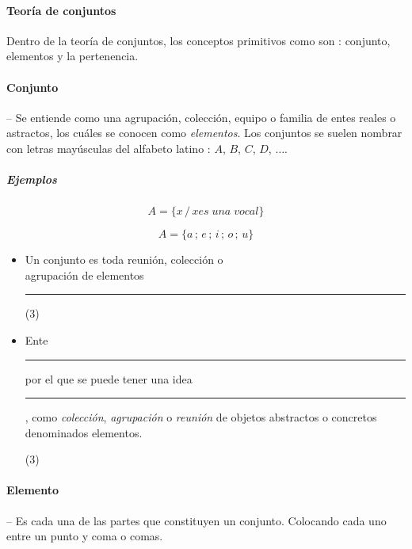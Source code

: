 \documentclass[10pt, twocolumn, landscape, a4paper]{article}
\begin{document}
\paragraph*{Teoría de conjuntos}
Dentro de la teoría de conjuntos, los conceptos primitivos como son : conjunto, elementos y la pertenencia.

\paragraph*{Conjunto} -- Se entiende como una agrupación, colección, equipo o familia de entes reales o astractos, los cuáles se conocen como \emph{elementos}. Los conjuntos se suelen nombrar con letras mayúsculas del alfabeto latino : $A$, $B$, $C$, $D$, $\ldots$.
\subparagraph*{Ejemplos}
$$
A = \{x\,/\,x es\;una\;vocal\}
$$

$$
A = \{a\,;\,e\,;\,i\,;\,o\,;\,u\}
$$


\begin{itemize}
\item{Un conjunto es toda reunión, colección o \\ agrupación de elementos \rule{20mm}{0.1mm}
\begin{tasks}(3)
\end{tasks}
}
\item{Ente \rule{20mm}{0.1mm} por el que se puede tener una idea \rule{20mm}{0.1mm}, como \emph{colección}, \emph{agrupación} o \emph{reunión} de objetos abstractos o concretos denominados elementos.
\begin{tasks}(3)
\end{tasks}
}
\end{itemize}

\paragraph*{Elemento} -- Es cada una de las partes que constituyen un conjunto. Colocando cada uno entre un punto y coma o comas.
\end{document}
